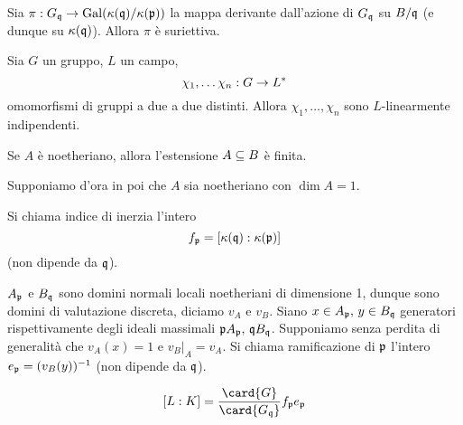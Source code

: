 \begin{proposition}
Sia $\pi:G_{\mathfrak{q}}\rightarrow \operatorname{Gal}(\kappa(\mathfrak{q})/\kappa(\mathfrak{p}))$ la mappa derivante dall'azione di $G_{\mathfrak{q}}$ su $B/\mathfrak{q}$ (e dunque su $\kappa(\mathfrak{q})$). Allora $\pi$ è suriettiva.
\end{proposition}
\begin{lemma}
Sia $G$ un gruppo, $L$ un campo,
$$
\chi_1,\ldots\chi_n:G\rightarrow L^*
$$
omomorfismi di gruppi a due a due distinti. Allora $\chi_1\comma\ldots\comma\chi_n$ sono $L$-linearmente indipendenti.
\end{lemma}
\begin{proposition}
Se $A$ è noetheriano, allora l'estensione $A\subseteq B$ è finita.
\end{proposition}
\begin{setting}
Supponiamo d'ora in poi che $A$ sia noetheriano con $\dim A=1$.
\end{setting}
\begin{definition}
Si chiama indice di inerzia l'intero
$$
f_{\mathfrak{p}}=[\kappa(\mathfrak{q}):\kappa(\mathfrak{p})]
$$
(non dipende da $\mathfrak{q}$).
\end{definition}
\begin{definition}
$A_{\mathfrak{p}}$ e $B_{\mathfrak{q}}$ sono domini normali locali noetheriani di dimensione 1, dunque sono domini di valutazione discreta, diciamo $v_A$ e $v_B$. Siano $x\in A_{\mathfrak{p}},\,\allowbreak y\in B_{\mathfrak{q}}$ generatori rispettivamente degli ideali massimali $\mathfrak{p} A_{\mathfrak{p}},\,\allowbreak\mathfrak{q} B_{\mathfrak{q}}$. Supponiamo senza perdita di generalità che $v_A(x)=1$ e $v_B|_A=v_A$. Si chiama ramificazione di $\mathfrak{p}$ l'intero $e_{\mathfrak{p}}=(v_B(y))^{-1}$ (non dipende da $\mathfrak{q}$).
\end{definition}

\begin{proposition}
$$
[L:K]=\frac{\card{G}}{\card{G_\qq}}f_\pp e_\pp
$$
\end{proposition}


